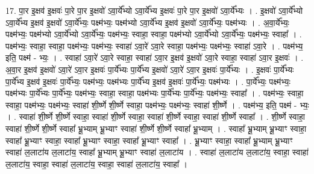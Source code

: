\documentclass[17pt]{extarticle}
\begin{document}
17. पा॒र इ॒क्षव॑ इ॒क्षवः॑ पा॒रे पा॒र इ॒क्षवो॑ ऽवा॒र्ये᳚भ्यो ऽवा॒र्ये᳚भ्य इ॒क्षवः॑ पा॒रे पा॒र इ॒क्षवो॑ ऽवा॒र्ये᳚भ्यः । . इ॒क्षवो॑ ऽवा॒र्ये᳚भ्यो ऽवा॒र्ये᳚भ्य इ॒क्षव॑ इ॒क्षवो॑ ऽवा॒र्ये᳚भ्यः॒ पक्ष्म॑भ्यः॒ पक्ष्म॑भ्यो ऽवा॒र्ये᳚भ्य इ॒क्षव॑ इ॒क्षवो॑ ऽवा॒र्ये᳚भ्यः॒ पक्ष्म॑भ्यः । . अ॒वा॒र्ये᳚भ्यः॒ पक्ष्म॑भ्यः॒ पक्ष्म॑भ्यो ऽवा॒र्ये᳚भ्यो ऽवा॒र्ये᳚भ्यः॒ पक्ष्म॑भ्यः॒ स्वाहा॒ स्वाहा॒ पक्ष्म॑भ्यो ऽवा॒र्ये᳚भ्यो ऽवा॒र्ये᳚भ्यः॒ पक्ष्म॑भ्यः॒ स्वाहा᳚ । . पक्ष्म॑भ्यः॒ स्वाहा॒ स्वाहा॒ पक्ष्म॑भ्यः॒ पक्ष्म॑भ्यः॒ स्वाहा॑ ऽवा॒रे॑ ऽवा॒रे स्वाहा॒ पक्ष्म॑भ्यः॒ पक्ष्म॑भ्यः॒ स्वाहा॑ ऽवा॒रे । . पक्ष्म॑भ्य॒ इति॒ पक्ष्म॑ - भ्यः॒ । . स्वाहा॑ ऽवा॒रे॑ ऽवा॒रे स्वाहा॒ स्वाहा॑ ऽवा॒र इ॒क्षव॑ इ॒क्षवो॑ ऽवा॒रे स्वाहा॒ स्वाहा॑ ऽवा॒र इ॒क्षवः॑ । . अ॒वा॒र इ॒क्षव॑ इ॒क्षवो॑ ऽवा॒रे॑ ऽवा॒र इ॒क्षवः॑ पा॒र्ये᳚भ्यः पा॒र्ये᳚भ्य इ॒क्षवो॑ ऽवा॒रे॑ ऽवा॒र इ॒क्षवः॑ पा॒र्ये᳚भ्यः । . इ॒क्षवः॑ पा॒र्ये᳚भ्यः पा॒र्ये᳚भ्य इ॒क्षव॑ इ॒क्षवः॑ पा॒र्ये᳚भ्यः॒ पक्ष्म॑भ्यः॒ पक्ष्म॑भ्यः पा॒र्ये᳚भ्य इ॒क्षव॑ इ॒क्षवः॑ पा॒र्ये᳚भ्यः॒ पक्ष्म॑भ्यः । . पा॒र्ये᳚भ्यः॒ पक्ष्म॑भ्यः॒ पक्ष्म॑भ्यः पा॒र्ये᳚भ्यः पा॒र्ये᳚भ्यः॒ पक्ष्म॑भ्यः॒ स्वाहा॒ स्वाहा॒ पक्ष्म॑भ्यः पा॒र्ये᳚भ्यः पा॒र्ये᳚भ्यः॒ पक्ष्म॑भ्यः॒ स्वाहा᳚ । . पक्ष्म॑भ्यः॒ स्वाहा॒ स्वाहा॒ पक्ष्म॑भ्यः॒ पक्ष्म॑भ्यः॒ स्वाहा॑ शी॒र्ष्णे शी॒र्ष्णे स्वाहा॒ पक्ष्म॑भ्यः॒ पक्ष्म॑भ्यः॒ स्वाहा॑ शी॒र्ष्णे । . पक्ष्म॑भ्य॒ इति॒ पक्ष्म॑ - भ्यः॒ । . स्वाहा॑ शी॒र्ष्णे शी॒र्ष्णे स्वाहा॒ स्वाहा॑ शी॒र्ष्णे स्वाहा॒ स्वाहा॑ शी॒र्ष्णे स्वाहा॒ स्वाहा॑ शी॒र्ष्णे स्वाहा᳚ । . शी॒र्ष्णे स्वाहा॒ स्वाहा॑ शी॒र्ष्णे शी॒र्ष्णे स्वाहा᳚ भ्रू॒भ्याम् भ्रू॒भ्याꣳ स्वाहा॑ शी॒र्ष्णे शी॒र्ष्णे स्वाहा᳚ भ्रू॒भ्याम् । . स्वाहा᳚ भ्रू॒भ्याम् भ्रू॒भ्याꣳ स्वाहा॒ स्वाहा᳚ भ्रू॒भ्याꣳ स्वाहा॒ स्वाहा᳚ भ्रू॒भ्याꣳ स्वाहा॒ स्वाहा᳚ भ्रू॒भ्याꣳ स्वाहा᳚ । . भ्रू॒भ्याꣳ स्वाहा॒ स्वाहा᳚ भ्रू॒भ्याम् भ्रू॒भ्याꣳ स्वाहा॑ ल॒लाटा॑य ल॒लाटा॑य॒ स्वाहा᳚ भ्रू॒भ्याम् भ्रू॒भ्याꣳ स्वाहा॑ ल॒लाटा॑य । . स्वाहा॑ ल॒लाटा॑य ल॒लाटा॑य॒ स्वाहा॒ स्वाहा॑ ल॒लाटा॑य॒ स्वाहा॒ स्वाहा॑ ल॒लाटा॑य॒ स्वाहा॒ स्वाहा॑ ल॒लाटा॑य॒ स्वाहा᳚ । \newline
\end{document}
